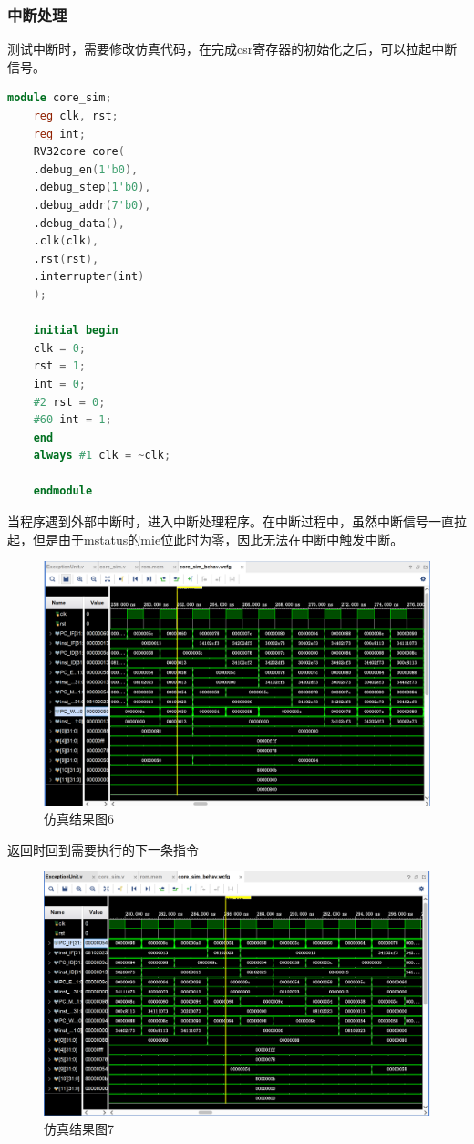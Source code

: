 \subsubsection{中断处理}
测试中断时，需要修改仿真代码，在完成csr寄存器的初始化之后，可以拉起中断信号。
\begin{lstlisting}[language = {verilog}]
	module core_sim;
	reg clk, rst;
	reg int;
	RV32core core(
	.debug_en(1'b0),
	.debug_step(1'b0),
	.debug_addr(7'b0),
	.debug_data(),
	.clk(clk),
	.rst(rst),
	.interrupter(int)
	);
	
	initial begin
	clk = 0;
	rst = 1;
	int = 0;
	#2 rst = 0;
	#60 int = 1;
	end
	always #1 clk = ~clk;
	
	endmodule
\end{lstlisting}
当程序遇到外部中断时，进入中断处理程序。在中断过程中，虽然中断信号一直拉起，但是由于mstatus的mie位此时为零，因此无法在中断中触发中断。
\begin{figure}[H] %
	\centering %
	\includegraphics[width=1.0\textwidth]{figs/4.png} %
	\caption{仿真结果图6} %
	\label{Fig.16} %
\end{figure}
返回时回到需要执行的下一条指令
\begin{figure}[H] %
	\centering %
	\includegraphics[width=1.0\textwidth]{figs/5.png} %
	\caption{仿真结果图7} %
	\label{Fig.17} %
\end{figure}
